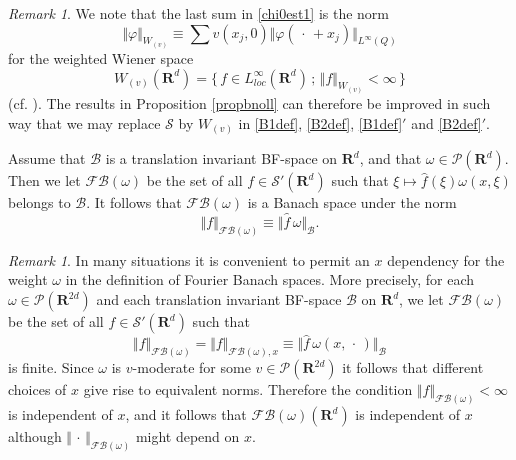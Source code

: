 \documentclass[12pt,a4paper,reqno]{amsart}
\numberwithin{equation}{section}
\numberwithin{thm}{section}
\theoremstyle{definition}
\theoremstyle{remark}
\newtheorem{rem}[thm]{Remark}
\begin{document}
\begin{rem}
We note that the last sum in \eqref{chi0est1} is the norm
$$
{\Vert {\varphi}\Vert _{{W_{(v)}}}} \equiv
\sum  v(x_j,0){\Vert {{\varphi} ({\, \cdot \, } +x_j)}\Vert _{{L^\infty (Q)}}}
$$ 
for the weighted Wiener space
$$
W_{(v)}({\mathbf R^{d}}) ={\{ \, {f\in L^\infty _{loc}({\mathbf R^{d}})}\, ;\, {{\Vert f\Vert _{{W_{(v)}}}}<\infty }\, \} }
$$
(cf. \cite{Gro-book}). The results in Proposition \ref{propbnoll} can therefore be improved in such way that we may replace $\mathscr S$ by $W_{(v)}$ in \eqref{B1def}, \eqref{B2def}, \eqref{B1def}$'$ and \eqref{B2def}$'$.
\end{rem}

\par

Assume that $\mathscr B$ is a translation invariant BF-space on ${\mathbf R^{d}}$, and that $\omega \in \mathscr P({\mathbf R^{d}})$. Then we let ${\mathscr F\! \mathscr B}
{(\omega )}$ be the set of all $f\in \mathscr S'({\mathbf R^{d}})$ such that
$\xi \mapsto \widehat f(\xi )\omega (x,\xi )$ belongs to $\mathscr
B$. It follows that ${\mathscr F\! \mathscr B} {(\omega )}$ is a Banach space under the
norm
\begin{equation}\label{FLnorm}
{\Vert f\Vert _{{{\mathscr F\! \mathscr B} {(\omega )}}}}\equiv {\Vert {\widehat
f\, \omega}\Vert _{{\mathscr B}}}.
\end{equation}

\par

\begin{rem} \label{whyomega}
In many situations it is convenient to permit an $x$
dependency for the weight $\omega$ in the definition of Fourier Banach spaces.
More precisely, for each $\omega \in \mathscr P({\mathbf R^{{2d}}})$ and each translation invariant BF-space $\mathscr B$ on ${\mathbf R^{d}}$, we let $\mathscr {FB}{(\omega )}$ be the set of all $f\in
\mathscr S'({\mathbf R^{d}})$ such that
$$
{\Vert f\Vert _{{\mathscr {FB}{(\omega )}}}}
= {\Vert f\Vert _{{\mathscr {FB}{(\omega),x}}}}
\equiv {\Vert {\widehat f\, \omega (x,{\, \cdot \, } )}\Vert _{{\mathscr B}}}
$$
is finite. Since $\omega$ is
$v$-moderate for some $v\in \mathscr P({\mathbf R^{{2d}}})$ it follows that
different choices of $x$ give rise to equivalent norms.
Therefore the condition
${\Vert f\Vert _{{{\mathscr F\! \mathscr B}(\omega )}}}<\infty$ is
independent of $x$, and  it follows that ${\mathscr F\! \mathscr B}(\omega )({\mathbf R^{d}})$ is  independent of $x$ although ${\Vert {\, \cdot \, }\Vert _{{{\mathscr F\! \mathscr B}(\omega )}}}$ might depend on $x$.
\end{rem}
\end{document}
